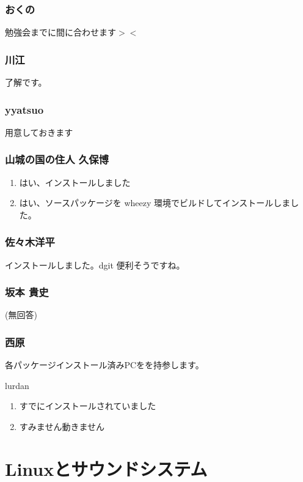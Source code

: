 \documentclass[cjk,dvipdfmx,10pt,compress,%
hyperref={bookmarks=true,bookmarksnumbered=true,bookmarksopen=false,%
colorlinks=false,%
pdftitle={第 76 回 関西 Debian 勉強会},%
pdfauthor={倉敷・のがた・佐々木・かわだ・八津尾},%
pdfsubject={資料},%
}]{beamer}
\begin{document}
\begin{frame}
  \frametitle{ おくの }
  勉強会までに間に合わせます$><$
\end{frame}

\begin{frame}
  \frametitle{ 川江 }
  了解です。
\end{frame}

\begin{frame}
  \frametitle{ yyatsuo }
  用意しておきます
\end{frame}

\begin{frame}
  \frametitle{ 山城の国の住人 久保博 }
  \begin{enumerate}
  \item はい、インストールしました
  \item はい、ソースパッケージを wheezy 環境でビルドしてインストールしました。
  \end{enumerate}
\end{frame}

\begin{frame}
  \frametitle{ 佐々木洋平 }
  インストールしました。dgit 便利そうですね。
\end{frame}

\begin{frame}
  \frametitle{ 坂本 貴史 }
  (無回答)
\end{frame}

\begin{frame}
  \frametitle{ 西原 }
  各パッケージインストール済みPCをを持参します。
\end{frame}

\begin{frame}{ lurdan }
  \begin{enumerate}
  \item すでにインストールされていました
  \item すみません動きません
  \end{enumerate}
\end{frame}

\section{Linuxとサウンドシステム}

\end{document}
